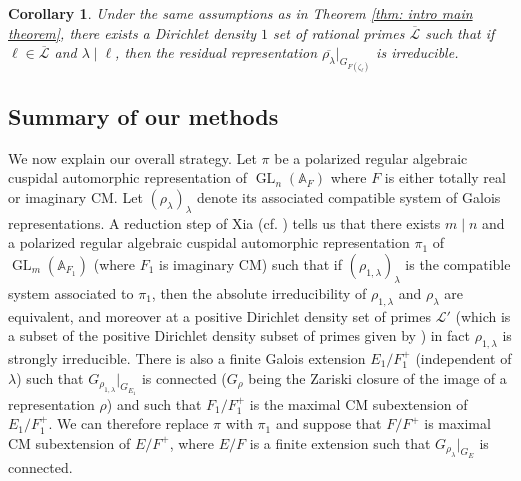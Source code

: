\documentclass{amsart}
\newtheorem{corollary}[theorem]{Corollary}
\theoremstyle{definition}
\numberwithin{equation}{section} %
\newcommand{\GL}{\operatorname{GL}}
\newcommand{\bb}[1]{\mathbb{#1}}
\newcommand{\mc}[1]{\mathcal{#1}}
\begin{document}
\begin{corollary} \label{cor: intro residual irreducibility}
Under the same assumptions as in Theorem \ref{thm: intro main theorem}, there exists a Dirichlet density \( 1 \) set of rational primes \( \overline{\mc{L}} \) such that if \( \ell \in \overline{\mc{L}} \) and \( \lambda\mid\ell\), then the residual representation \( \overline{\rho_\lambda}|_{G_{F(\zeta_\ell)}} \) is irreducible.
\end{corollary}

\subsection{Summary of our methods}

We now explain our overall strategy. Let \( \pi \) be a polarized regular algebraic cuspidal automorphic representation of \( \GL_n(\bb{A}_F) \) where \( F \) is either totally real or imaginary CM. Let \( (\rho_\lambda)_\lambda \) denote its associated compatible system of Galois representations. A reduction step of Xia (cf. ) tells us that there exists \( m\mid n \) and a polarized regular algebraic cuspidal automorphic representation \( \pi_1 \) of \( \GL_m(\bb{A}_{F_1}) \) (where \( F_1 \) is imaginary CM) such that if \( (\rho_{1,\lambda})_\lambda \) is the compatible system associated to \( \pi_1 \), then the absolute irreducibility of \( \rho_{1,\lambda} \) and \( \rho_\lambda \) are equivalent, and moreover at a positive Dirichlet density set of primes \( \mc{L}' \) (which is a subset of the positive Dirichlet density subset of primes given by \cite{PatTay15}) in fact \( \rho_{1,\lambda} \) is strongly irreducible. There is also a finite Galois extension \( E_1/F_1^+ \) (independent of \( \lambda \)) such that \( G_{\rho_{1,\lambda}}|_{G_{E_1}} \) is connected (\( G_{\rho} \) being the Zariski closure of the image of a representation \( \rho \)) and such that \( F_1/F_1^+ \) is the maximal CM subextension of \( E_1/F_1^+ \). We can therefore replace \( \pi \) with \( \pi_1 \) and
suppose that \( F/F^+ \) is maximal CM subextension of \( E/F^+ \), where \( E/F \) is a finite extension such that \( G_{\rho_\lambda}|_{G_E} \) is connected.
\end{document}
